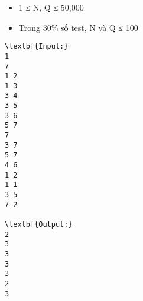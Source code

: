 \begin{itemize}
	\item     1 ≤ N, Q ≤ 50,000   
	\item     Trong 30\% số test, N và Q ≤ 100   
\end{itemize}
\begin{verbatim}
\textbf{Input:}
1
7
1 2
1 3
3 4
3 5
3 6
5 7
7
3 7
5 7
4 6
1 2
1 1
3 5
7 2

\textbf{Output:}
2
3
3
3
3
2
3
\end{verbatim}